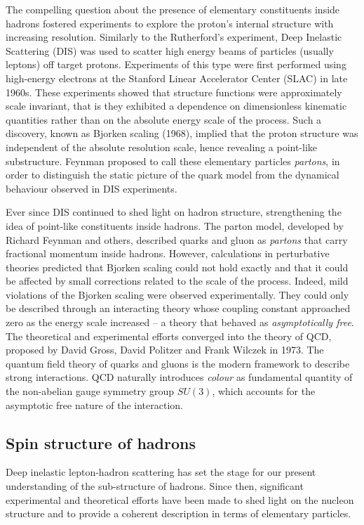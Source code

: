 The compelling question about the presence of elementary constituents inside hadrons fostered experiments to explore the proton's internal structure with increasing resolution. Similarly to the Rutherford's experiment, Deep Inelastic Scattering (DIS) was used to scatter high energy beams of particles (usually leptons) off target protons. Experiments of this type were first performed using high-energy electrons at the Stanford Linear Accelerator Center (SLAC) in late 1960s. These experiments showed that structure functions were approximately scale invariant, that is they exhibited a dependence on dimensionless kinematic quantities rather than on the absolute energy scale of the process. Such a discovery, known as Bjorken scaling (1968), implied that the proton structure was independent of the absolute resolution scale, hence revealing a point-like substructure. Feynman proposed to call these elementary particles \textit{partons}, in order to distinguish the static picture of the quark model from the dynamical behaviour observed in DIS experiments.%

Ever since DIS continued to shed light on hadron structure, strengthening the idea of point-like constituents inside hadrons. The parton model, developed by Richard Feynman and others, described quarks and gluon as \textit{partons} that carry fractional momentum inside hadrons. However, calculations in perturbative theories predicted that Bjorken scaling could not hold exactly and that it could be affected by small corrections related to the scale of the process. Indeed, mild violations of the Bjorken scaling were observed experimentally. They could only be described through an interacting theory whose coupling constant approached zero as the energy scale increased -- a theory that behaved as \textit{asymptotically free}. The theoretical and experimental efforts converged into the theory of QCD, proposed by David Gross, David Politzer and Frank Wilczek in 1973. The quantum field theory of quarks and gluons is the modern framework to describe strong interactions. QCD naturally introduces \textit{colour} as fundamental quantity of the non-abelian gauge symmetry group $SU(3)$, which accounts for the asymptotic free nature of the interaction.


\subsection*{Spin structure of hadrons}

Deep inelastic lepton-hadron scattering has set the stage for our present understanding of the sub-structure of hadrons. Since then, significant experimental and theoretical efforts have been made to shed light on the nucleon structure and to provide a coherent description in terms of elementary particles.%

